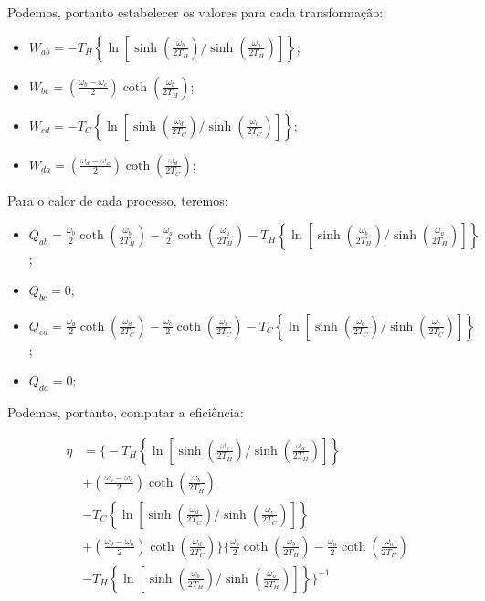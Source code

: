 Podemos, portanto estabelecer os valores para cada transformação:

\begin{itemize}
\item $W_{ab} = - T_H \left\{ \ln \left[ \sinh \left( \frac{\omega_b}{2 T_H} \right) \Big/ \sinh \left( \frac{\omega_a}{2 T_H} \right) \right] \right\}$;
\item $W_{bc} = \left( \frac{\omega_b - \omega_c}{2} \right) \coth \left( \frac{\omega_b}{2 T_H} \right)$;
\item $W_{cd} = - T_C \left\{ \ln \left[ \sinh \left( \frac{\omega_d}{2 T_C} \right) \Big/ \sinh \left( \frac{\omega_c}{2 T_C} \right) \right] \right\}$;
\item $W_{da} = \left( \frac{\omega_d - \omega_a}{2} \right) \coth \left( \frac{\omega_d}{2 T_C} \right)$;
\end{itemize}

Para o calor de cada processo, teremos:

\begin{itemize}
\item $Q_{ab} = \frac{\omega_b}{2} \coth \left( \frac{\omega_b}{2T_H} \right) - \frac{\omega_a}{2} \coth \left( \frac{\omega_a}{2T_H} \right) - T_H \left\{ \ln \left[ \sinh \left( \frac{\omega_b}{2 T_H} \right) \Big/ \sinh \left( \frac{\omega_a}{2 T_H} \right) \right] \right\}$;
\item $Q_{bc} = 0$;
\item $Q_{cd} = \frac{\omega_d}{2} \coth \left( \frac{\omega_d}{2T_C} \right) - \frac{\omega_c}{2} \coth \left( \frac{\omega_c}{2T_C} \right) - T_C \left\{ \ln \left[ \sinh \left( \frac{\omega_d}{2 T_C} \right) \Big/ \sinh \left( \frac{\omega_c}{2 T_C} \right) \right] \right\}$;
\item $Q_{da} = 0$;
\end{itemize}

Podemos, portanto, computar a eficiência:

\begin{equation}
\begin{split}
\eta &= \Bigg\{- T_H \left\{ \ln \left[ \sinh \left( \frac{\omega_b}{2 T_H} \right) \Big/ \sinh \left( \frac{\omega_a}{2 T_H} \right) \right] \right\} \\& + \left( \frac{\omega_b - \omega_c}{2} \right) \coth \left( \frac{\omega_b}{2 T_H} \right) \\& - T_C \left\{ \ln \left[ \sinh \left( \frac{\omega_d}{2 T_C} \right) \Big/ \sinh \left( \frac{\omega_c}{2 T_C} \right) \right] \right\} \\& + \left( \frac{\omega_d - \omega_a}{2} \right) \coth \left( \frac{\omega_d}{2 T_C} \right) \Bigg\} \Bigg\{ \frac{\omega_b}{2} \coth \left( \frac{\omega_b}{2T_H} \right) - \frac{\omega_a}{2} \coth \left( \frac{\omega_a}{2T_H} \right) \\& - T_H \left\{ \ln \left[ \sinh \left( \frac{\omega_b}{2 T_H} \right) \Big/ \sinh \left( \frac{\omega_a}{2 T_H} \right) \right] \right\} \Bigg\}^{-1}
\end{split}
\end{equation}

